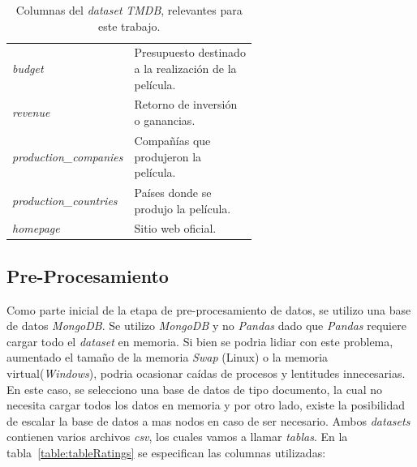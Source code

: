 \documentclass[11pt,a4paper,twoside]{thesis}
\begin{document}
\begin{table}[!htb]
\begin{tabular}{l | p{0.6\linewidth}}
		\textit{budget}                           & Presupuesto destinado a la realización de la película.                                \\
		\textit{revenue}                          & Retorno de inversión o ganancias.                                                     \\
		\textit{production\_companies}            & Compañías que produjeron la película.                                                 \\
		\textit{production\_countries}            & Países donde se produjo la película.                                                  \\
		\textit{homepage}                         & Sitio web oficial.                                                                    \\

		\hline
	\end{tabular}
	\caption{
		Columnas del \textit{dataset} \textit{TMDB}, relevantes para este trabajo.
	}
	\label{table:tmdbColumns}
\end{table}

\clearpage

\subsection{Pre-Procesamiento}

Como parte inicial de la etapa de pre-procesamiento de datos, se utilizo una
base de datos \textit{MongoDB}. Se utilizo \textit{MongoDB} y no
\textit{Pandas} dado que \textit{Pandas} requiere cargar todo el
\textit{dataset} en memoria. Si bien se podria lidiar con este problema,
aumentado el tamaño de la memoria \textit{Swap} (Linux) o la memoria
virtual(\textit{Windows}), podria ocasionar caídas de procesos y lentitudes
innecesarias. En este caso, se selecciono una base de datos de tipo documento,
la cual no necesita cargar todos los datos en memoria y por otro lado, existe
la posibilidad de escalar la base de datos a mas nodos en caso de ser
necesario. Ambos \textit{datasets} contienen varios archivos \textit{csv}, los
cuales vamos a llamar \textit{tablas}. En la tabla~\ref{table:tableRatings} se
especifican las columnas utilizadas:
\end{document}
